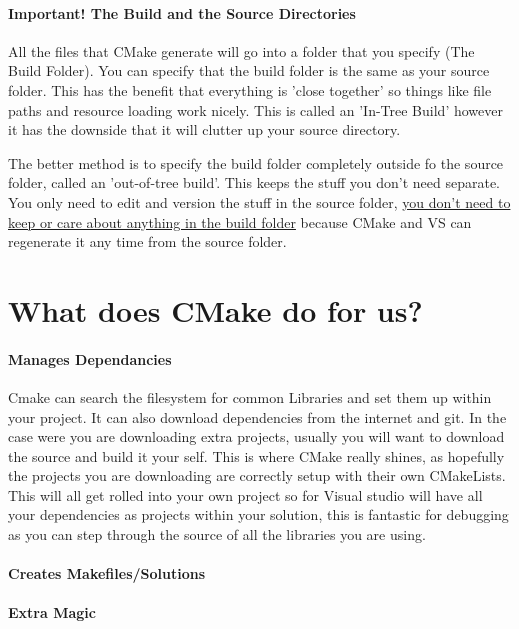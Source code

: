 \documentclass[11pt, a4paper]{article}
\begin{document}
	\paragraph{Important! The Build and the Source Directories}
	All the files that CMake generate will go into a folder that you specify (The Build Folder). You can specify that the build folder is the same as your source folder. This has the benefit that everything is 'close together' so things like file paths and resource loading work nicely. This is called an 'In-Tree Build' however it has the downside that it will clutter up your source directory.
	
	The better method is to specify the build folder completely outside fo the source folder, called an 'out-of-tree build'. This keeps the stuff you don't need separate. You only need to edit and version the stuff in the source folder, \underline{you don't need to keep or care about anything in the build folder} because CMake and VS can regenerate it any time from the source folder.
	
	
    \section{What does CMake do for us?}
		\paragraph{Manages Dependancies}
		Cmake can search the filesystem for common Libraries and set them up within your project. It can also download dependencies from  the internet and git. In the case were you are downloading extra projects, usually you will want to download the source and build it your self. This is where CMake really shines,  as hopefully the projects you are downloading are correctly setup with their own CMakeLists. This will all get rolled into your own project so for Visual studio will have all your dependencies as projects within your solution, this is fantastic for debugging as you can step through the source of all the libraries you are using.
		
		\paragraph{Creates Makefiles/Solutions}
		
		\paragraph{Extra Magic} 
\end{document}
